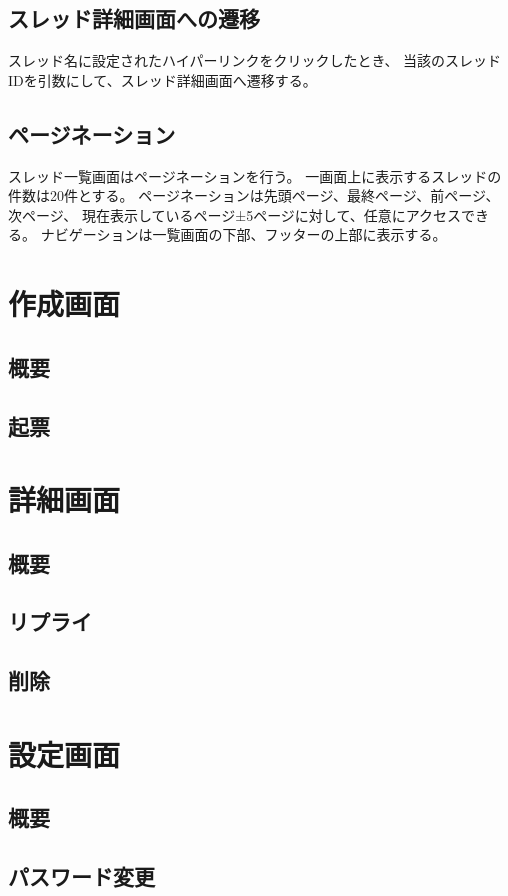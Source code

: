         \subsection{スレッド詳細画面への遷移}
スレッド名に設定されたハイパーリンクをクリックしたとき、
当該のスレッドIDを引数にして、スレッド詳細画面へ遷移する。

        \subsection{ページネーション}
スレッド一覧画面はページネーションを行う。
一画面上に表示するスレッドの件数は20件とする。
ページネーションは先頭ページ、最終ページ、前ページ、次ページ、
現在表示しているページ±5ページに対して、任意にアクセスできる。
ナビゲーションは一覧画面の下部、フッターの上部に表示する。

    \section{作成画面}
        \subsection{概要}
        \subsection{起票}
    \section{詳細画面}
        \subsection{概要}
        \subsection{リプライ}
        \subsection{削除}
    \section{設定画面}
        \subsection{概要}
        \subsection{パスワード変更}
